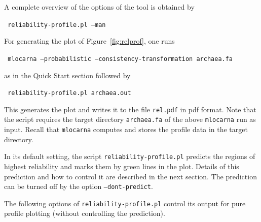 \documentclass{article}
\newenvironment{ttbox}{%
  \begin{framed}\begin{minipage}{1.0\textwidth}\tt}%
{\end{minipage}\end{framed}}
\begin{document}
A complete overview of the options of the tool is obtained by
\begin{ttbox}
  reliability-profile.pl --man
\end{ttbox}

For generating the plot of Figure~\ref{fig:relprof}, one runs
\begin{ttbox}
  mlocarna --probabilistic --consistency-transformation archaea.fa
\end{ttbox}
as in the Quick Start section followed by
\begin{ttbox}
  reliability-profile.pl archaea.out
\end{ttbox}
This generates the plot and writes it to the file \texttt{rel.pdf} in
pdf format. Note that the script requires the target directory
\texttt{archaea.fa} of the above \texttt{mlocarna} run as
input. Recall that \texttt{mlocarna} computes and stores the profile
data in the target directory.

In its default setting, the script \texttt{reliability-profile.pl}
predicts the regions of highest reliability and marks them by green
lines in the plot. Details of this prediction and how to control it
are described in the next section. The prediction can be turned off by
the option \texttt{--dont-predict}.

The following options of \texttt{reliability-profile.pl} control its
output for pure profile plotting (without controlling the prediction). 
\end{document}
